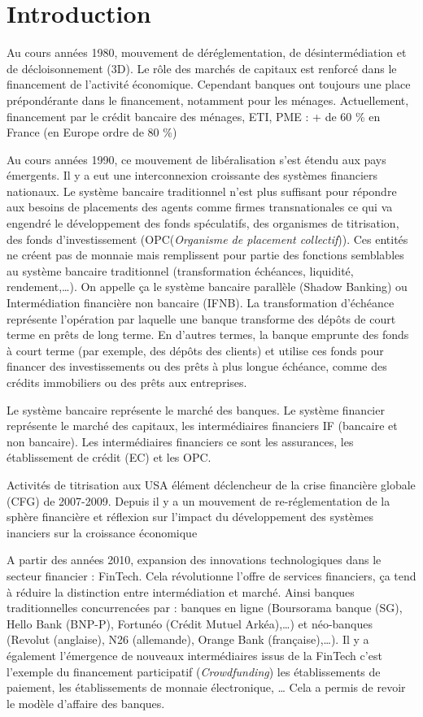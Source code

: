 \documentclass[a4paper, 12pt]{report}
\begin{document}
	\chapter*{Introduction}
	
Au cours années 1980, mouvement de déréglementation, de désintermédiation et de décloisonnement (3D). Le rôle des marchés de capitaux est renforcé dans le financement de l’activité économique. Cependant banques ont toujours une place prépondérante dans le financement, notamment pour les ménages. 
Actuellement, financement par le crédit bancaire des ménages, ETI, PME : +
de 60 \% en France (en Europe ordre de 80 \%)

Au cours années 1990, ce mouvement de libéralisation s’est étendu aux pays émergents. Il y a eut une interconnexion croissante des systèmes financiers nationaux. Le système bancaire traditionnel n’est plus suffisant pour répondre
aux besoins de placements des agents comme firmes transnationales ce qui va engendré le développement des fonds spéculatifs, des organismes de
titrisation, des fonds d’investissement (OPC(\textit{Organisme de placement collectif})). Ces entités ne créent pas de monnaie mais remplissent pour partie des fonctions semblables au système bancaire traditionnel (transformation échéances, liquidité, rendement,…). On appelle ça le système bancaire parallèle (Shadow Banking) ou Intermédiation financière non bancaire (IFNB). La transformation d'échéance représente l'opération par laquelle une banque transforme des dépôts de court terme en prêts de long terme. En d'autres termes, la banque emprunte des fonds à court terme (par exemple, des dépôts des clients) et utilise ces fonds pour financer des investissements ou des prêts à plus longue échéance, comme des crédits immobiliers ou des prêts aux entreprises.

Le système bancaire représente le marché des banques. Le système financier représente le marché des capitaux, les intermédiaires financiers IF (bancaire et non bancaire). Les intermédiaires financiers ce sont les assurances, les établissement de crédit (EC) et les OPC.

Activités de titrisation aux USA élément déclencheur de la crise financière globale (CFG) de 2007-2009. Depuis il y a un mouvement de re-réglementation de la sphère financière et réflexion sur l’impact du développement des systèmes inanciers sur la croissance économique

A partir des années 2010, expansion des innovations technologiques dans le secteur financier : FinTech. Cela révolutionne l’offre de services financiers, ça tend à réduire la distinction entre intermédiation et marché. Ainsi banques traditionnelles concurrencées par : banques en ligne (Boursorama banque (SG), Hello Bank (BNP-P), Fortunéo (Crédit Mutuel Arkéa),…) et néo-banques (Revolut (anglaise), N26 (allemande), Orange Bank (française),…). Il y a également l'émergence de nouveaux intermédiaires issus de la FinTech c'est l'exemple du financement participatif (\textit{Crowdfunding}) les établissements de paiement, les établissements de monnaie électronique, … Cela a permis de revoir le modèle d’affaire des banques.
\end{document}

